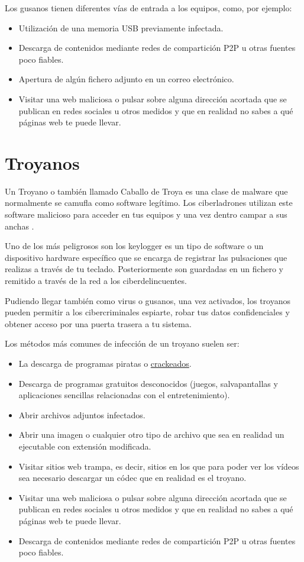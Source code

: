\documentclass[
  a4paper,
  openany]{book}
\begin{document}
Los gusanos tienen diferentes vías de entrada a los equipos, como, por ejemplo:

\begin{itemize}
\item
  Utilización de una memoria USB previamente infectada.
\item
  Descarga de contenidos mediante redes de compartición P2P u otras fuentes poco fiables.
\item
  Apertura de algún fichero adjunto en un correo electrónico.
\item
  Visitar una web maliciosa o pulsar sobre alguna dirección acortada que se publican en redes sociales u otros medidos y que en realidad no sabes a qué páginas web te puede llevar.
\end{itemize}

\hypertarget{troyanos}{%
\section{Troyanos}\label{troyanos}}

Un Troyano o también llamado Caballo de Troya es una clase de malware que normalmente se camufla como software legítimo. Los ciberladrones utilizan este software malicioso para acceder en tus equipos y una vez dentro campar a sus anchas \citep{KASPER-troyano}.

Uno de los más peligrosos son los keylogger es un tipo de software o un dispositivo hardware específico que se encarga de registrar las pulsaciones que realizas a través de tu teclado. Posteriormente son guardadas en un fichero y remitido a través de la red a los ciberdelincuentes.

Pudiendo llegar también como virus o gusanos, una vez activados, los troyanos pueden permitir a los cibercriminales espiarte, robar tus datos confidenciales y obtener acceso por una puerta trasera a tu sistema.

Los métodos más comunes de infección de un troyano suelen ser:

\begin{itemize}
\item
  La descarga de programas piratas o \href{https://es.wikipedia.org/wiki/Cracking_(software)}{crackeados}.
\item
  Descarga de programas gratuitos desconocidos (juegos, salvapantallas y aplicaciones sencillas relacionadas con el entretenimiento).
\item
  Abrir archivos adjuntos infectados.
\item
  Abrir una imagen o cualquier otro tipo de archivo que sea en realidad un ejecutable con extensión modificada.
\item
  Visitar sitios web trampa, es decir, sitios en los que para poder ver los vídeos sea necesario descargar un códec que en realidad es el troyano.
\item
  Visitar una web maliciosa o pulsar sobre alguna dirección acortada que se publican en redes sociales u otros medidos y que en realidad no sabes a qué páginas web te puede llevar.
\item
  Descarga de contenidos mediante redes de compartición P2P u otras fuentes poco fiables.
\end{itemize}
\end{document}

